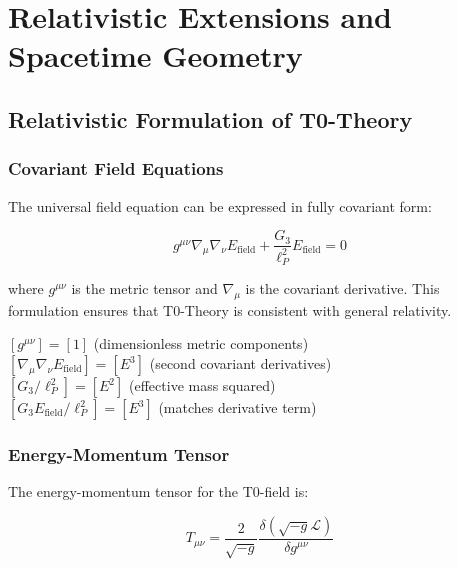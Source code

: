 \documentclass[12pt,a4paper]{article}
\theoremstyle{definition}
\begin{document}
	
	\section{Relativistic Extensions and Spacetime Geometry}
	
	\subsection{Relativistic Formulation of T0-Theory}
	
	\subsubsection{Covariant Field Equations}
	
	The universal field equation can be expressed in fully covariant form:
	
	\begin{equation}
		\boxed{g^{\mu\nu}\nabla_\mu\nabla_\nu E_{\text{field}} + \frac{G_3}{\ell_P^2} E_{\text{field}} = 0}
	\end{equation}
	
	where $g^{\mu\nu}$ is the metric tensor and $\nabla_\mu$ is the covariant derivative. This formulation ensures that T0-Theory is consistent with general relativity.
	
	\begin{einheitencheck}
		$[g^{\mu\nu}] = [1]$ (dimensionless metric components) \checkmark\\
		$[\nabla_\mu\nabla_\nu E_{\text{field}}] = [E^3]$ (second covariant derivatives) \checkmark\\
		$[G_3/\ell_P^2] = [E^2]$ (effective mass squared) \checkmark\\
		$[G_3 E_{\text{field}}/\ell_P^2] = [E^3]$ (matches derivative term) \checkmark
	\end{einheitencheck}
	
	\subsubsection{Energy-Momentum Tensor}
	
	The energy-momentum tensor for the T0-field is:
	
	\begin{equation}
		T_{\mu\nu} = \frac{2}{\sqrt{-g}} \frac{\delta(\sqrt{-g}\mathcal{L})}{\delta g^{\mu\nu}}
	\end{equation}
	
\end{document}
